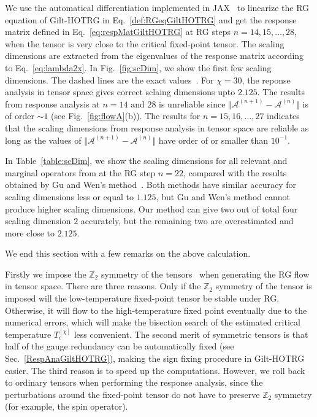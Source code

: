 \documentclass[aps,prb,reprint,superscriptaddress]{revtex4-2}
\begin{document}
We use the automatical differentiation implemented in
JAX~\cite{jax2018github} to linearize the RG equation of Gilt-HOTRG in
Eq.~\eqref{def:RGeqGiltHOTRG} and get the response matrix defined in
Eq.~\eqref{eq:respMatGiltHOTRG} at RG steps $n = 14,15,\ldots, 28$, when the
tensor is very close to the critical fixed-point tensor. The scaling
dimensions are extracted from the eigenvalues of the response matrix
according to Eq.~\eqref{eq:lambda2x}. In Fig.~\ref{fig:scDim}, we show
the first few scaling dimensions. The dashed lines are the exact
values~\cite{DiFrancesco1997}. For $\chi = 30$, the reponse analysis in
tensor space gives correct sclaing dimensions upto $2.125$. The results from
response analysis at $n = 14 \text{ and } 28$ is unreliable since $\Vert
\mathcal{A}^{(n+1)} - \mathcal{A}^{(n)}\Vert$ is of order $\sim 1$ (see
Fig.~\ref{fig:flowA}(b)). The results for $n = 15,16,\ldots,27$
indicates that the scaling dimensions from response analysis in tensor
space are reliable as long as the values of $\Vert \mathcal{A}^{(n+1)} -
\mathcal{A}^{(n)}\Vert$ have order of or smaller than $10^{-1}$. 
%

In Table~\ref{table:scDim}, we show the scaling dimensions for all
relevant and marginal operators from at the RG step $n = 22$, compared with
the results obtained by Gu and Wen's method~\cite{GuWen2009}. Both
methods have similar accuracy for scaling dimensions less or equal to
$1.125$, but Gu and Wen's method cannot produce higher scaling
dimensions. Our method can give two out of total four scaling dimension
$2$ accurately, but the remaining two are overestimated and more close
to $2.125$.
%

We end this section with a few remarks on the above calculation. 
%

Firstly we impose the $\mathbb{Z}_2$ symmetry of the
tensors~\cite{Singh2010SymTen, Singh2011U1Ten} when generating the RG
flow in tensor space. There are three reasons. Only if the
$\mathbb{Z}_2$ symmetry of the tensor is imposed will the
low-temperature fixed-point tensor be stable under RG.  Otherwise, it
will flow to the high-temperature fixed point eventually due to the
numerical errors, which will make the bisection search of the estimated
critical temperature $T_c^{[\chi]}$ less convenient. The second merit of
symmetric tensors is that half of the gauge redundancy can be
automatically fixed (see Sec.~\ref{RespAnaGiltHOTRG}), making the sign
fixing procedure in Gilt-HOTRG easier. The third reason is to speed up
the computations. However, we roll back to ordinary tensors when
performing the response analysis, since the perturbations around the
fixed-point tensor do not have to preserve $\mathbb{Z}_2$ symmetry (for
example, the spin operator). 
%
\end{document}
